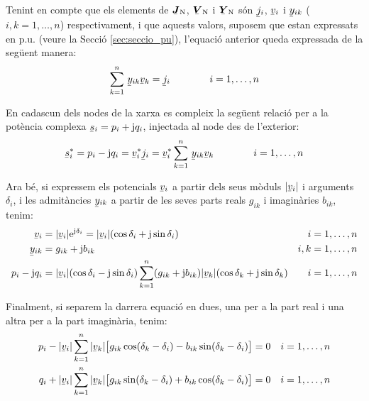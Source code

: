 Tenint en compte que els elements de $\mcmplx{J}\ped{N}$, $\mcmplx{V}\ped{N}$ i
$\mcmplx{Y}\ped{N}$ s\'{o}n $\cmplx{j}_i$, $\cmplx{v}_i$ i  $\cmplx{y}_{ik}$
($i,k=1,\ldots,n$) respectivament, i que aquests valors, suposem que estan expressats en
p.u. (veure la Secci\'{o} \ref{sec:seccio_pu}), l'equaci\'{o} anterior queda expressada de la seg\"{u}ent manera:
\begin{equation}
    \sum^n_{k=1}\, \cmplx{y}_{ik} \cmplx{v}_k = \cmplx{j}_i \qquad\qquad i=1,\ldots,n
\end{equation}

En cadascun dels nodes de la xarxa es compleix la seg\"{u}ent relaci\'{o} per a la pot\`{e}ncia
complexa $\cmplx{s}_i = p_i + \ju q_i$, injectada al node des de l'exterior:
\begin{equation}
    \cmplx{s}_i^* = p_i - \ju q_i = \cmplx{v}_i^* \cmplx{j}_i = \cmplx{v}_i^*
    \sum^n_{k=1}\, \cmplx{y}_{ik} \cmplx{v}_k \qquad\qquad i=1,\ldots,n \label{eq:sconj}
\end{equation}

Ara b\'{e}, si expressem els potencials $\cmplx{v}_i$ a partir dels seus m\`{o}duls $|\cmplx{v}_i|$
i arguments $\delta_i$, i les admit\`{a}ncies $\cmplx{y}_{ik}$ a partir de les seves parts
reals $g_{ik}$ i imagin\`{a}ries $b_{ik}$, tenim:
\begin{align}
    \cmplx{v}_i &=|\cmplx{v}_i| \eu^{\ju\delta_i} = |\cmplx{v}_i|
    (\cos\delta_i+\ju\sin\delta_i) & i & =1,\ldots,n\\
    \cmplx{y}_{ik} &= g_{ik} + \ju b_{ik} & i,k & =1,\ldots,n \\
    p_i - \ju q_i &= |\cmplx{v}_i| (\cos\delta_i - \ju\sin\delta_i) \sum^n_{k=1} (g_{ik} + \ju
    b_{ik}) |\cmplx{v}_k| (\cos\delta_k + \ju\sin\delta_k) & i & =1,\ldots,n
\end{align}

Finalment, si separem la darrera equaci\'{o} en dues, una per a  la part real i  una altra per
a la part imagin\`{a}ria, tenim:
\begin{align}
    p_i - |\cmplx{v}_i| \sum^n_{k=1}  |\cmplx{v}_k| \bigl[ g_{ik} \cos(\delta_k - \delta_i) -
     b_{ik} \sin(\delta_k - \delta_i) \bigr] &= 0  & i&=1,\ldots,n\label{eq:p0} \\
    q_i + |\cmplx{v}_i| \sum^n_{k=1}  |\cmplx{v}_k| \bigl[ g_{ik} \sin(\delta_k - \delta_i) +
      b_{ik} \cos(\delta_k - \delta_i) \bigr] &= 0 & i&=1,\ldots,n\label{eq:q0}
\end{align}

